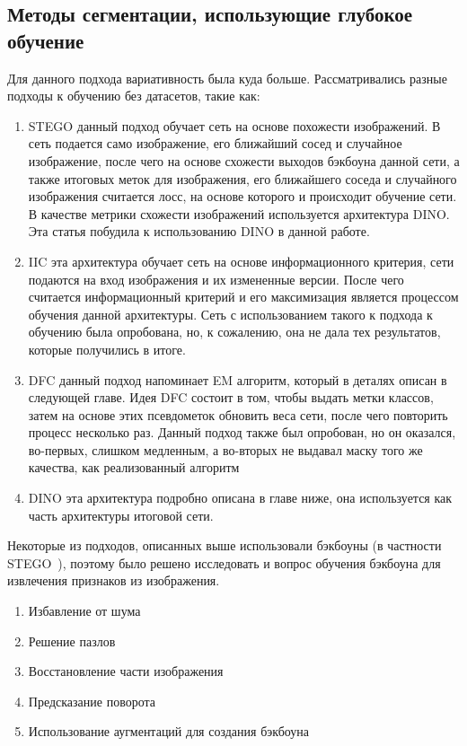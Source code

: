 \subsection{Методы сегментации, использующие глубокое обучение}
Для данного подхода вариативность была куда больше. 
Рассматривались разные подходы к обучению без датасетов, такие как:
\begin{enumerate}
    \item STEGO\cite{stego} данный подход обучает сеть на основе похожести изображений. В сеть подается само изображение, его ближайший сосед и случайное изображение, 
    после чего на основе схожести выходов бэкбоуна данной сети, а также итоговых меток для изображения, его ближайшего соседа и случайного изображения считается лосс, 
    на основе которого и происходит обучение сети. В качестве метрики схожести изображений используется архитектура DINO. Эта статья побудила к использованию DINO в данной работе.
    \item IIC\cite{iic} эта архитектура обучает сеть на основе информационного критерия, сети подаются на вход изображения и их измененные версии. 
    После чего считается информационный критерий и его максимизация является процессом обучения данной архитектуры. Сеть с использованием такого к подхода к обучению 
    была опробована, но, к сожалению, она не дала тех результатов, которые получились в итоге.
    \item DFC\cite{dfc} данный подход напоминает EM алгоритм, который в деталях описан в следующей главе. Идея DFC состоит в том, чтобы выдать метки классов, затем на основе 
    этих псевдометок обновить веса сети, после чего повторить процесс несколько раз. Данный подход также был опробован, но он оказался, во-первых, слишком медленным, а
    во-вторых не выдавал маску того же качества, как реализованный алгоритм 
    \item DINO\cite{DINO} эта архитектура подробно описана в главе ниже, она используется как часть архитектуры итоговой сети.
\end{enumerate}
Некоторые из подходов, описанных выше использовали бэкбоуны (в частности STEGO~\cite{stego}), поэтому было решено исследовать и вопрос обучения бэкбоуна для извлечения 
признаков из изображения. 
\begin{enumerate}
    \item Избавление от шума\cite{denoise}
    \item Решение пазлов\cite{puzzles}
    \item Восстановление части изображения\cite{drawing_backbone}
    \item Предсказание поворота\cite{rotation_prediction}
    \item Использование аугментаций для создания бэкбоуна\cite{augmentations_learning}
\end{enumerate}

